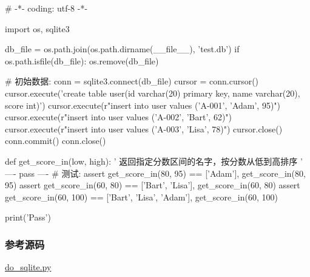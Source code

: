 \begin{pythoncode}
# -*- coding: utf-8 -*-

import os, sqlite3

db_file = os.path.join(os.path.dirname(__file__), 'test.db')
if os.path.isfile(db_file):
    os.remove(db_file)

# 初始数据:
conn = sqlite3.connect(db_file)
cursor = conn.cursor()
cursor.execute('create table user(id varchar(20) primary key, name varchar(20), score int)')
cursor.execute(r"insert into user values ('A-001', 'Adam', 95)")
cursor.execute(r"insert into user values ('A-002', 'Bart', 62)")
cursor.execute(r"insert into user values ('A-003', 'Lisa', 78)")
cursor.close()
conn.commit()
conn.close()

def get_score_in(low, high):
    ' 返回指定分数区间的名字，按分数从低到高排序 '
----
    pass
----
# 测试:
assert get_score_in(80, 95) == ['Adam'], get_score_in(80, 95)
assert get_score_in(60, 80) == ['Bart', 'Lisa'], get_score_in(60, 80)
assert get_score_in(60, 100) == ['Bart', 'Lisa', 'Adam'], get_score_in(60, 100)

print('Pass')
\end{pythoncode}

\hypertarget{ux53c2ux8003ux6e90ux7801}{%
\subsubsection{参考源码}\label{ux53c2ux8003ux6e90ux7801}}

\href{https://github.com/michaelliao/learn-python3/blob/master/samples/db/do_sqlite.py}{do\_sqlite.py}


